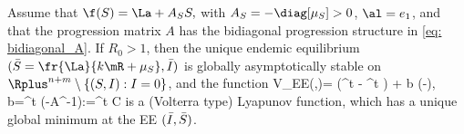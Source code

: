 \begin{figure}
{
}
\end{figure}

 Assume that $\f( \y)=\La+ A_S \y,$ with {$A_S=-\diag[\mu_S]>0$, $\al=e_1$, and that the progression matrix $A$ has the bidiagonal progression structure in \eqref{eq: bidiagonal_A}}. If $R_0> 1$, then the unique endemic equilibrium $(\bar{S}=\fr{\La}{k \mR +\mu_S}, \bar{I})$ is globally asymptotically stable on $\Rplus^{n+m} \setminus \{(S,I) : I = 0\}$, and the function
 V_{EE}(\x,\y)=
 (^t \y- \ye^t \circ \ln \y) + b (\x -\xe \circ\ln \x ), \qu b=\ye^t
\bbe (-A^{-1}):=\ye^t C
\ee
is a (Volterra type) Lyapunov function,
which has a unique global minimum at the EE $(\bar{I} , \bar{S})$.
\eeT

